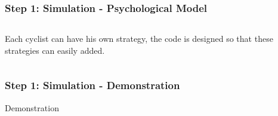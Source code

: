 \documentclass{beamer}
\begin{document}
\begin{frame}
\frametitle{Step 1: Simulation - Psychological Model}

\begin{columns}
  \begin{column}{0.6\textwidth}
    Each cyclist can have his own strategy, the code is designed so that these strategies can easily added.\\
    \begin{itemize}
    \end{itemize}
  \end{column}

  \begin{column}{0.4\textwidth}
  \end{column}
\end{columns}

\end{frame}


\begin{frame}
\frametitle{Step 1: Simulation - Demonstration}
\huge
\hspace{3.5cm} Demonstration
\end{frame}
\end{document}
